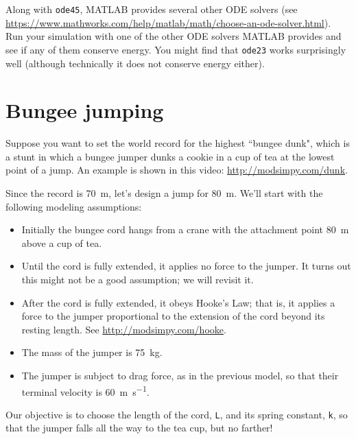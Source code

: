\documentclass[main.tex]{subfiles}
\begin{document}
Along with {\tt ode45}, MATLAB provides several other ODE solvers (see \url{https://www.mathworks.com/help/matlab/math/choose-an-ode-solver.html}).
Run your simulation with one of the other ODE solvers MATLAB provides
and see if any of them conserve energy.  You might find that {\tt ode23} works surprisingly well (although technically it does not conserve energy either).


\section{Bungee jumping}
\label{bungee}


Suppose you want to set the world record for the highest ``bungee dunk", which is a stunt in which a bungee jumper dunks a cookie in a cup of tea at the lowest point of a jump.  An example is shown in this video: \url{http://modsimpy.com/dunk}.

Since the record is \SI{70}{\meter}, let's design a jump for \SI{80}{\meter}.  We'll start with the following modeling assumptions:

\begin{itemize}

\item  Initially the bungee cord hangs from a crane with the attachment point \SI{80}{\meter} above a cup of tea.

\item Until the cord is fully extended, it applies no force to the jumper.  It turns out this might not be a good assumption; we will revisit it.

\item After the cord is fully extended, it obeys Hooke's Law; that is, it applies a force to the jumper proportional to the extension of the cord beyond its resting length.  See \url{http://modsimpy.com/hooke}. 

\item The mass of the jumper is \SI{75}{\kilogram}.

\item The jumper is subject to drag force, as in the previous model, so that their terminal velocity is \SI{60}{\meter \per \second}.

\end{itemize}

Our objective is to choose the length of the cord, {\tt L}, and its spring constant, {\tt k}, so that the jumper falls all the way to the tea cup, but no farther!
\end{document}

